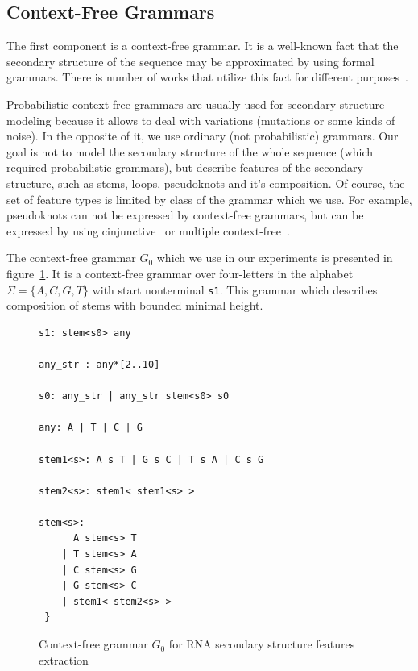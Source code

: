 \documentclass[a4paper,twoside]{article}
\begin{document}
\subsection{Context-Free Grammars}

\noindent The first component is a context-free grammar. 
It is a well-known fact that the secondary structure of the sequence may be approximated by using formal grammars.
There is number of works that utilize this fact for different purposes~\cite{GrammarsRNA,LWPCFG,zier2013rna,knudsen2003pfold}.

Probabilistic context-free grammars are usually used for secondary structure modeling because it allows to deal with variations (mutations or some kinds of noise).
In the opposite of it, we use ordinary (not probabilistic) grammars.
Our goal is not to model the secondary structure of the whole sequence (which required probabilistic grammars), but describe features of the secondary structure, such as stems, loops, pseudoknots and it's composition.
Of course, the set of feature types is limited by class of the grammar which we use.
For example, pseudoknots can not be expressed by context-free grammars, but can be expressed by using cinjunctive~\cite{KanchanDevi2017,zier2013rna,Okhotin:2001:CG:543313.543323} or multiple context-free~\cite{SEKI1991191,Riechert:2016:ADP:2972703.2972851}.

The context-free grammar $G_0$ which we use in our experiments is presented in figure~\ref{fig:cfg-rna}.
It is a context-free grammar over four-letters in the alphabet $\Sigma=\{A,C,G,T\}$ with start nonterminal \verb|s1|.
This grammar which describes composition of stems with bounded minimal height.

\begin{figure}
\begin{verbatim}
s1: stem<s0> any

any_str : any*[2..10]

s0: any_str | any_str stem<s0> s0

any: A | T | C | G

stem1<s>: A s T | G s C | T s A | C s G 

stem2<s>: stem1< stem1<s> >

stem<s>:  
      A stem<s> T 
    | T stem<s> A 
    | C stem<s> G 
    | G stem<s> C 
    | stem1< stem2<s> >  
 } 
\end{verbatim}
\caption{Context-free grammar $G_0$ for RNA secondary structure features extraction}
\label{fig:cfg-rna}
\end{figure}
\end{document}
